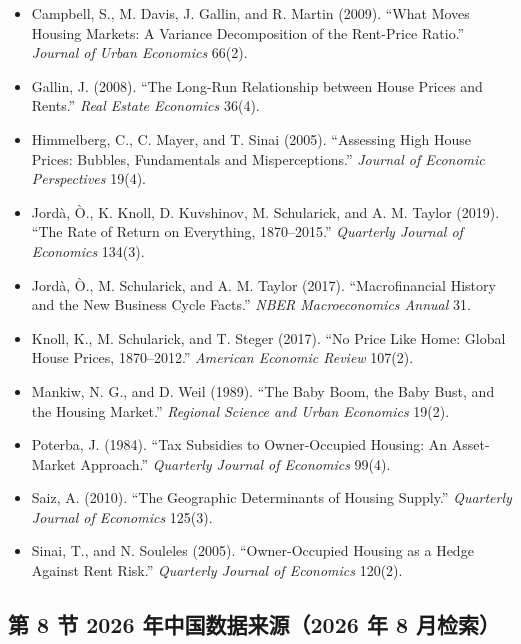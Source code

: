 \documentclass[11pt,a4paper]{ctexart}
\begin{document}
\begin{itemize}\itemsep0.2em
\item Campbell, S., M. Davis, J. Gallin, and R. Martin (2009). ``What Moves Housing Markets: A Variance Decomposition of the Rent-Price Ratio.'' \emph{Journal of Urban Economics} 66(2).
\item Gallin, J. (2008). ``The Long-Run Relationship between House Prices and Rents.'' \emph{Real Estate Economics} 36(4).
\item Himmelberg, C., C. Mayer, and T. Sinai (2005). ``Assessing High House Prices: Bubbles, Fundamentals and Misperceptions.'' \emph{Journal of Economic Perspectives} 19(4).
\item Jordà, Ò., K. Knoll, D. Kuvshinov, M. Schularick, and A. M. Taylor (2019). ``The Rate of Return on Everything, 1870--2015.'' \emph{Quarterly Journal of Economics} 134(3).
\item Jordà, Ò., M. Schularick, and A. M. Taylor (2017). ``Macrofinancial History and the New Business Cycle Facts.'' \emph{NBER Macroeconomics Annual} 31.
\item Knoll, K., M. Schularick, and T. Steger (2017). ``No Price Like Home: Global House Prices, 1870--2012.'' \emph{American Economic Review} 107(2).
\item Mankiw, N. G., and D. Weil (1989). ``The Baby Boom, the Baby Bust, and the Housing Market.'' \emph{Regional Science and Urban Economics} 19(2).
\item Poterba, J. (1984). ``Tax Subsidies to Owner-Occupied Housing: An Asset-Market Approach.'' \emph{Quarterly Journal of Economics} 99(4).
\item Saiz, A. (2010). ``The Geographic Determinants of Housing Supply.'' \emph{Quarterly Journal of Economics} 125(3).
\item Sinai, T., and N. Souleles (2005). ``Owner-Occupied Housing as a Hedge Against Rent Risk.'' \emph{Quarterly Journal of Economics} 120(2).
\end{itemize}

\subsection*{第 8 节 2026 年中国数据来源（2026 年 8 月检索）}
\end{document}
